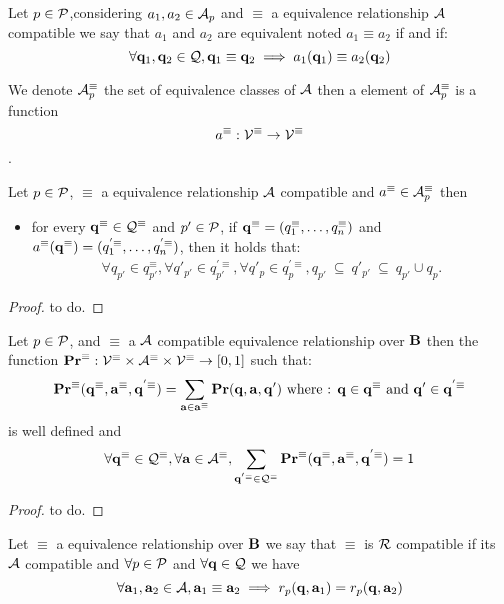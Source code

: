 \begin{mydef}
	Let $p \in \mathcal{P}$,considering $a_1, a_2 \in \mathcal{A}_p$ and $\equiv$ a equivalence relationship $\mathcal{A}$ compatible we say that $a_1$ and $a_2$ are equivalent noted $a_1 \equiv a_2$ if and if:
	$$\forall \mathbf{q}_1,\mathbf{q}_2 \in \mathcal{Q}, \mathbf{q}_1 \equiv \mathbf{q}_2 \implies a_1(\mathbf{q}_1) \equiv a_2(\mathbf{q}_2)$$
\end{mydef}
We denote $\mathcal{A}^\equiv_p$ the set of equivalence classes of $\mathcal{A}$ then a element of $\mathcal{A}^\equiv_p$ is a function $$a^\equiv : \mathcal{V}^\equiv \rightarrow \mathcal{V}^\equiv$$.

\begin{myprop}
	Let $p \in \mathcal{P}$, $\equiv$ a equivalence relationship $\mathcal{A}$ compatible and $a^\equiv \in \mathcal{A}^\equiv_p $ then
	\begin{itemize}
		\item for every $\mathbf{q}^\equiv \in \mathcal{Q}^\equiv$ and $p' \in \mathcal{P}$, if $\mathbf{q}^\equiv = (q_1^\equiv, \ldots, q_n^\equiv)$ and $a^\equiv(\mathbf{q}^\equiv) = (q_1^{'\equiv}, \ldots, q_n^{'\equiv})$, then it holds that:
		\begin{eqnarray*}
			\forall q_{p'} \in q_{p'}^\equiv,\forall q'_{p'} \in q_{p'} ^{'\equiv},\forall q'_p \in q_p^{'\equiv},  q_{p'} \ \subseteq \ q'_{p'} \ \subseteq \ q_{p'} \cup q_p.
		\end{eqnarray*}
	\end{itemize}
\end{myprop}

\begin{proof}
	to do.
\end{proof}


\begin{myprop}
	Let $p \in \mathcal{P}$, and $\equiv$ a $\mathcal{A}$ compatible equivalence relationship over $\text{\bf B}$
	then the function $\mathbf{Pr}^\equiv : \mathcal{V}^\equiv \times \mathcal{A}^\equiv \times \mathcal{V}^\equiv \rightarrow [0,1]$ such that: 
	$$\mathbf{Pr}^\equiv(\mathbf{q}^\equiv,\mathbf{a}^\equiv,\mathbf{q}^{'\equiv}) = \sum_{\mathbf{a} \in \mathbf{a}^\equiv}\mathbf{Pr}(\mathbf{q},\mathbf{a},\mathbf{q}') \mbox{ where : } \mathbf{q} \in \mathbf{q}^\equiv \mbox{ and } \mathbf{q}' \in \mathbf{q}^{'\equiv}$$ 
	is well defined and 
	$$\forall \mathbf{q}^\equiv \in \mathcal{Q}^\equiv,\forall \mathbf{a} \in \mathcal{A}^\equiv, \sum_{\mathbf{q} ^{'\equiv} \in \mathcal{Q}^\equiv} \mathbf{Pr}^\equiv(\mathbf{q}^\equiv, \mathbf{a}^\equiv, \mathbf{q}^{'\equiv})  =  1 $$
\end{myprop}
\begin{proof}
	to do.
\end{proof}

\begin{mydef}
	Let $\equiv$ a equivalence relationship over $\text{\bf B}$ we say that $\equiv$ is $\mathcal{R}$ compatible if its $\mathcal{A}$ compatible and $\forall p \in \mathcal{P}$ and $\forall \mathbf{q} \in \mathcal{Q}$ we have 
	$$\forall \mathbf{a}_1,\mathbf{a}_2 \in \mathcal{A}, \mathbf{a}_1 \equiv \mathbf{a}_2 \implies r_p(\mathbf{q},\mathbf{a}_1) = r_p(\mathbf{q},\mathbf{a}_2)$$
\end{mydef}

